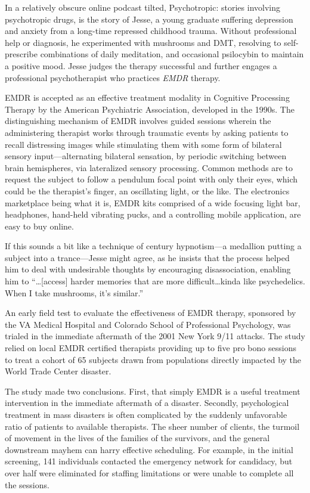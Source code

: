 \documentclass{UIdahoMastersThesis}
\begin{document}
In a relatively obscure online podcast tilted, Psychotropic: stories involving psychotropic drugs, is the story of Jesse, a young graduate suffering depression and anxiety from a long-time repressed childhood trauma. Without professional help or diagnosis, he experimented with mushrooms and DMT, resolving to self-prescribe combinations of daily meditation, and occasional psilocybin to maintain a positive mood. Jesse judges the therapy successful and further engages a professional psychotherapist who practices \textit{\ac{EMDR}} therapy. 

\ac{EMDR} is accepted as an effective treatment modality in Cognitive Processing Therapy by the American Psychiatric Association, developed in the 1990s. The distinguishing mechanism of \ac{EMDR} involves guided sessions wherein the administering therapist works through traumatic events by asking patients to recall distressing images while stimulating them with some form of bilateral sensory input---alternating bilateral sensation, by periodic switching between brain hemispheres, via lateralized sensory processing. Common methods are to request the subject to follow a pendulum focal point with only their eyes, which could be the therapist's finger, an oscillating light, or the like. The electronics marketplace being what it is, \ac{EMDR} kits comprised of a wide focusing light bar, headphones, hand-held vibrating pucks, and a controlling mobile application, are easy to buy online. 

If this sounds a bit like a technique of  century hypnotism---a medallion putting a subject into a trance---Jesse might agree, as he insists that the process helped him to deal with undesirable thoughts by encouraging disassociation, enabling him to \enquote{\ldots[access] harder memories that are more difficult\ldots kinda like psychedelics. When I take mushrooms, it's similar.}

An early field test to evaluate the effectiveness of EMDR therapy, sponsored by the VA Medical Hospital and Colorado School of Professional Psychology, was trialed in the immediate aftermath of the 2001 New York 9/11 attacks. The study relied on local EMDR certified therapists providing up to five pro bono sessions to treat a cohort of 65 subjects drawn from populations directly impacted by the World Trade Center disaster. 

The study made two conclusions. First, that simply EMDR is a useful treatment intervention in the immediate aftermath of a disaster. Secondly, psychological treatment in mass disasters is often complicated by the suddenly unfavorable ratio of patients to available therapists. The sheer number of clients, the turmoil of movement in the lives of the families of the survivors, and the general downstream mayhem can harry effective scheduling. For example, in the initial screening, 141 individuals contacted the emergency network for candidacy, but over half were eliminated for staffing limitations or were unable to complete all the sessions.
\end{document}
